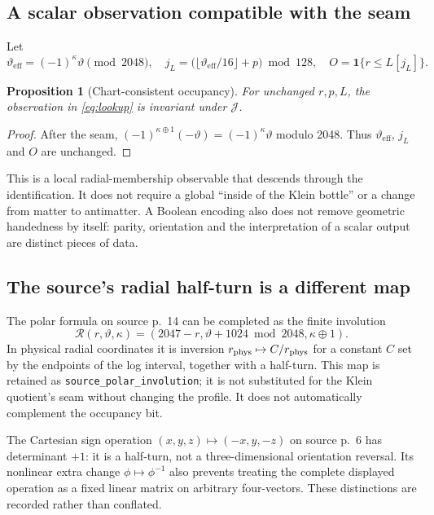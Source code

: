 \documentclass[11pt,a4paper]{article}
\newtheorem{proposition}{Proposition}[section]
\newcommand{\ind}{\mathbf{1}}
\numberwithin{equation}{section}
\begin{document}
\subsection{A scalar observation compatible with the seam}
Let
\begin{equation}
\vartheta_{\mathrm{eff}}=(-1)^\kappa\vartheta\pmod{2048},\quad
j_L=\bigl(\lfloor\vartheta_{\mathrm{eff}}/16\rfloor+p\bigr)\bmod128,
\quad O=\ind\{r\le L[j_L]\}.
\label{eq:lookup}
\end{equation}
\begin{proposition}[Chart-consistent occupancy]
For unchanged $r,p,L$, the observation in \eqref{eq:lookup} is invariant under $\mathcal J$.
\end{proposition}
\begin{proof}
After the seam, $(-1)^{\kappa\oplus1}(-\vartheta)=(-1)^\kappa\vartheta$ modulo 2048. Thus $\vartheta_{\mathrm{eff}}$, $j_L$ and $O$ are unchanged.
\end{proof}
This is a local radial-membership observable that descends through the identification. It does not require a global ``inside of the Klein bottle'' or a change from matter to antimatter. A Boolean encoding also does not remove geometric handedness by itself: parity, orientation and the interpretation of a scalar output are distinct pieces of data.

\subsection{The source's radial half-turn is a different map}
The polar formula on source p.~14 can be completed as the finite involution
\begin{equation}
\mathcal R(r,\vartheta,\kappa)=
(2047-r,\vartheta+1024\bmod2048,\kappa\oplus1).
\end{equation}
In physical radial coordinates it is inversion $r_{\rm phys}\mapsto C/r_{\rm phys}$ for a constant $C$ set by the endpoints of the log interval, together with a half-turn. This map is retained as \texttt{source\_polar\_involution}; it is not substituted for the Klein quotient's seam without changing the profile. It does not automatically complement the occupancy bit.

The Cartesian sign operation $(x,y,z)\mapsto(-x,y,-z)$ on source p.~6 has determinant $+1$: it is a half-turn, not a three-dimensional orientation reversal. Its nonlinear extra change $\phi\mapsto\phi^{-1}$ also prevents treating the complete displayed operation as a fixed linear matrix on arbitrary four-vectors. These distinctions are recorded rather than conflated.
\end{document}
